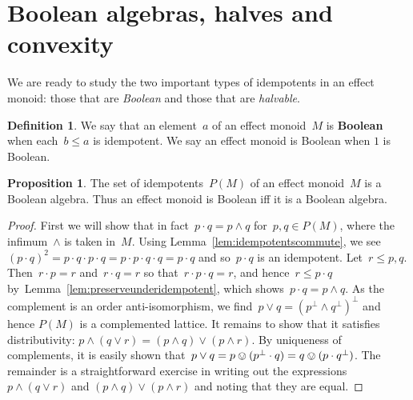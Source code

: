 \documentclass[10pt,conference]{IEEEtran}
\newcommand\Define[1]{\textbf{#1}}
\newcounter{counter}
\theoremstyle{definition}
\newtheorem{proposition}[counter]{Proposition}
\newtheorem{definition}[counter]{Definition}
\begin{document}
\section{Boolean algebras, halves and convexity}\label{sec:boolhalvesconvexity}
We are ready to study the two important types of idempotents
    in an effect monoid: those that are \emph{Boolean}
    and those that are \emph{halvable}.

\begin{definition}
We say that an element~$a$ of an effect monoid~$M$
    is \Define{Boolean} when each~$b\leq a$
    is idempotent. We say an effect monoid is Boolean
    when $1$ is Boolean.
\end{definition}

\begin{proposition}\label{prop:booleanalgebra}
    The set of idempotents~$P(M)$ of an effect monoid~$M$
        is a Boolean algebra.
        Thus an effect monoid is Boolean iff it is a Boolean algebra.
\end{proposition}
\begin{proof}
    First we will show that in fact~$p\cdot q = p\wedge q$
        for~$p,q \in P(M)$, where the infimum~$\wedge$ is taken in~$M$.
    Using Lemma~\ref{lem:idempotentscommute},
    we see~$(p \cdot q)^2 = p\cdot q\cdot p\cdot q = p\cdot
    p\cdot q\cdot q = p\cdot q$ and so~$p \cdot q$ is an idempotent.
    Let~$r \leq p, q$.
    Then~$r \cdot p = r$ and~$r \cdot q = r$
        so that~$r \cdot p \cdot q = r$, and
        hence~$r \leq p \cdot q$ by~Lemma~\ref{lem:preserveunderidempotent},
        which shows~$p \cdot q = p \wedge q$.
     As the complement is an order anti-isomorphism,
        we find~$p\vee q = (p^\perp \wedge q^\perp)^\perp$ and
    hence $P(M)$ is a complemented lattice.
    It remains to show that
    it satisfies distributivity: $p\wedge(q\vee r) = (p\wedge q)\vee
    (p\wedge r)$.
    By uniqueness of complements,
     it is easily shown that~$p\vee q
     = p \ovee (p^\perp \cdot q) = q \ovee ( p\cdot q^\perp)$.
    The remainder is a straightforward exercise in writing out
    the expressions $p\wedge(q\vee r)$ and $(p\wedge q)\vee
        (p\wedge r)$ and noting that they are equal.
\end{proof}
\end{document}
